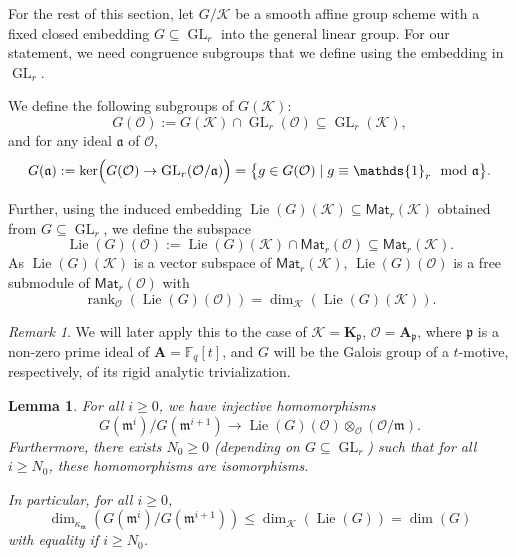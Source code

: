 \documentclass[10pt,a4paper]{amsart}
\theoremstyle{plain} %
\newtheorem{Lemma}[Theorem]{Lemma}
\theoremstyle{definition}
\theoremstyle{remark}
\newtheorem{Remark}[Theorem]{Remark}
\newcommand{\FF}{\mathbb{F}}
\newcommand{\cK}{\mathcal{K}}   %
\newcommand{\cO}{\mathcal{O}}   %
\newcommand{\fp}{\mathfrak{p}}  %
\newcommand{\fa}{\mathfrak{a}}  %
\newcommand{\fm}{\mathfrak{m}}  %
\newcommand{\bA}{\mathbf{A}}
\newcommand{\bK}{\mathbf{K}}
\newcommand{\Fq}{\FF_{\!q}}  %
\newcommand{\rk}{\operatorname{rank}}
\newcommand{\one}{\mathds{1}}
\newcommand{\Mat}{\mathsf{Mat}}
\newcommand{\GL}{\operatorname{GL}}
\newcommand{\Lie}{\operatorname{Lie}}
\numberwithin{equation}{subsection}
\begin{document}
For the rest of this section, 
let $G/\cK$ be a smooth affine group scheme with a fixed closed embedding $G\subseteq \GL_r$ into the general linear group.
For our statement, we need congruence subgroups that we define using the embedding in $\GL_r$.

We define the following subgroups of $G(\cK)$:
\[  G(\cO) := G(\cK)\cap \GL_r(\cO)\subseteq \GL_r(\cK), \]
and for any ideal $\fa$ of $\cO$,
\[    G(\fa) := \ker\Bigl( G(\cO)\to \GL_r(\cO/\fa)\Bigr)= \bigl\{ g\in G(\cO) \mid  g\equiv \one_r \mod \fa \bigr\}. \] 

Further, using the induced embedding $\Lie(G)(\cK)\subseteq \Mat_r(\cK)$ obtained from $G\subseteq \GL_r$, we define the subspace
\[  \Lie(G)(\cO) := \Lie(G)(\cK)\cap \Mat_r(\cO)\subseteq \Mat_r(\cK). \] 
As $\Lie(G)(\cK)$ is a vector subspace of $\Mat_r(\cK)$, $\Lie(G)(\cO)$ is a free submodule of $\Mat_r(\cO)$ with
\[  \rk_{\cO}(\Lie(G)(\cO)) = \dim_{\cK}(\Lie(G)(\cK)).\]

\begin{Remark}
    We will later apply this to the case of $\cK=\bK_\fp$, $\cO=\bA_\fp$, where $\fp$ is a non-zero prime ideal of $\bA=\Fq[t]$, and $G$ will be the Galois group of a $t$-motive, respectively, of its rigid analytic trivialization.
\end{Remark} 

\begin{Lemma}\label{lem:isomorphism-to-Lie-algebra}
    For all $i\geq 0$, we have injective homomorphisms
    \[ G(\fm^i)/G(\fm^{i+1}) \longrightarrow \Lie(G)(\cO)\otimes_\cO (\cO/\fm).\]
    Furthermore, there exists $N_0\geq 0$ (depending on $G\subseteq \GL_r$) such that for all $i\geq N_0$, these homomorphisms are isomorphisms.

    In particular, for all $i\geq 0$,
    \[   \dim_{\kappa_\fm}\left(G(\fm^i)/G(\fm^{i+1})\right) \leq  \dim_\cK(\Lie(G))=\dim(G) \]
    with equality if $i\geq N_0$.
\end{Lemma}
\end{document}
